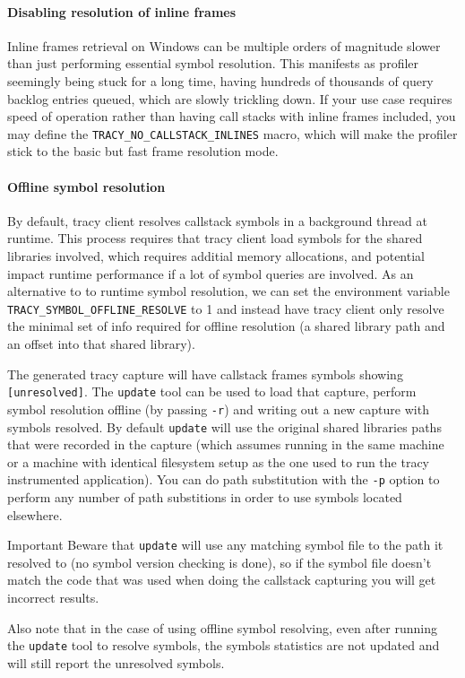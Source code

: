 \documentclass[hidelinks,titlepage,a4paper,twoside]{article}
\begin{document}
\paragraph{Disabling resolution of inline frames}

Inline frames retrieval on Windows can be multiple orders of magnitude slower than just performing essential symbol resolution. This manifests as profiler seemingly being stuck for a long time, having hundreds of thousands of query backlog entries queued, which are slowly trickling down. If your use case requires speed of operation rather than having call stacks with inline frames included, you may define the \texttt{TRACY\_NO\_CALLSTACK\_INLINES} macro, which will make the profiler stick to the basic but fast frame resolution mode.

\paragraph{Offline symbol resolution}

By default, tracy client resolves callstack symbols in a background thread at runtime.
This process requires that tracy client load symbols for the shared libraries
involved, which requires additial memory allocations, and potential impact runtime performance if a lot of symbol queries are involved.
As an alternative to to runtime symbol resolution, we can set the environment variable
 \texttt{TRACY\_SYMBOL\_OFFLINE\_RESOLVE} to 1 and instead have tracy client only resolve
 the minimal set of info required for offline resolution (a shared library path and an offset into that shared library).

The generated tracy capture will have callstack frames symbols showing \texttt{[unresolved]}.
The \texttt{update} tool can be used to load that capture, perform symbol resolution offline
(by passing \texttt{-r}) and writing out a new capture with symbols resolved.
By default \texttt{update} will use the original shared libraries paths that were recorded
in the capture (which assumes running in the same machine or a machine with identical
filesystem setup as the one used to run the tracy instrumented application).
 You can do path substitution with the \texttt{-p} option to perform any number of path
substitions in order to use symbols located elsewhere.

\begin{bclogo}[
noborder=true,
couleur=black!5,
logo=\bcbombe
]{Important}
Beware that \texttt{update} will use any matching symbol file to the path it resolved to (no symbol version checking is done), so if the symbol file doesn't match the code that was used when doing the callstack capturing you will get incorrect results.

Also note that in the case of using offline symbol resolving, even after running the \texttt{update} tool to resolve symbols, the symbols statistics are not updated and will still report the unresolved symbols.
\end{bclogo}
\end{document}
